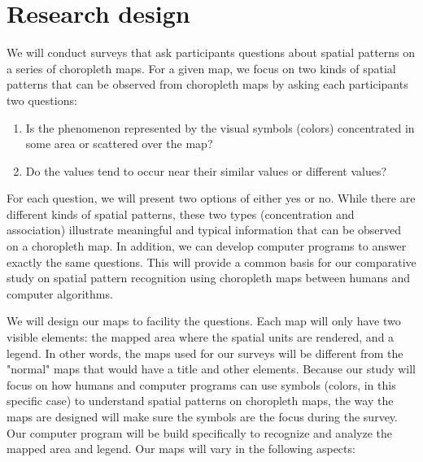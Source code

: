 
\section{Research design}


We will conduct surveys that ask participants questions about spatial patterns on a series of choropleth maps. For a given map, we focus on two kinds of spatial patterns that can be observed from choropleth maps by asking each participants two questions:

\begin{enumerate}
    \item Is the phenomenon represented by the visual symbols (colors) concentrated in some area or scattered over the map? 
    \item Do the values tend to occur near their similar values or different values? 
\end{enumerate}

For each question, we will present two options of either yes or no. While there are different kinds of spatial patterns, these two types (concentration and association) illustrate meaningful and typical information that can be observed on a choropleth map. In addition, we can develop computer programs to answer exactly the same questions. This will provide a common basis for our comparative study on spatial pattern recognition using choropleth maps between humans and computer algorithms.

We will design our maps to facility the questions. Each map will only have two visible elements: the mapped area where the spatial units are rendered, and a legend. In other words, the maps used for our surveys will be different from the "normal" maps that would have a title and other elements. Because our study will focus on how humans and computer programs can use symbols (colors, in this specific case) to understand spatial patterns on choropleth maps, the way the maps are designed will make sure the symbols are the focus during the survey. Our computer program will be build specifically to recognize and analyze the mapped area and legend. Our maps will vary in the following aspects:

